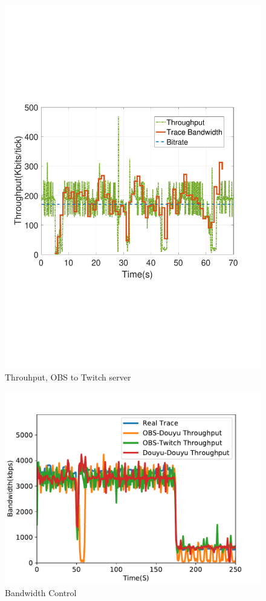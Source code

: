 \begin{figure}[htb]
  \includegraphics[width=\linewidth]{fig/obs_twitch.pdf}
  \caption{Throuhput, OBS to Twitch server}
  \label{fig:obs-twitch}
\endminipage
\end{figure}

\begin{figure}[htb]
\centering
\includegraphics[width=.8\columnwidth]{fig/vary-bandwidth.pdf}
\caption{Bandwidth Control}
\label{fig:vary-bandwidth}
\end{figure}

